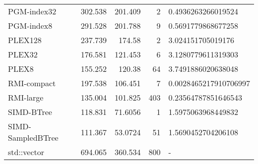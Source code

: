 \begin{tabular}{lrrrl}
 PGM-index32       &                302.538 &              201.409  &            2 & 0.4936263266019524    \\
 PGM-index8        &                291.528 &              201.788  &            9 & 0.5691779868677258    \\
 PLEX128           &                237.739 &              174.58   &            2 & 3.024151705019176     \\
 PLEX32            &                176.581 &              121.453  &            6 & 3.1280779611319303    \\
 PLEX8             &                155.252 &              120.38   &           64 & 3.7491886020638048    \\
 RMI-compact       &                197.538 &              106.451  &            7 & 0.0028465217910706997 \\
 RMI-large         &                135.004 &              101.825  &          403 & 0.23564787851646543   \\
 SIMD-BTree        &                118.831 &               71.6056 &            1 & 1.5975063968449832    \\
 SIMD-SampledBTree &                111.367 &               53.0724 &           51 & 1.5690452704206108    \\
 std::vector       &                694.065 &              360.534  &          800 & -                     \\
\hline
\end{tabular}